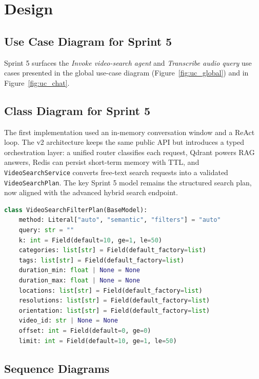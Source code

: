 \section{Design}

\subsection{Use Case Diagram for Sprint 5}

Sprint 5 surfaces the \emph{Invoke video-search agent} and \emph{Transcribe audio query} use cases
presented in the global use-case diagram (Figure~\ref{fig:uc_global}) and in
Figure~\ref{fig:uc_chat}.

\subsection{Class Diagram for Sprint 5}

The first implementation used an in-memory conversation window and a ReAct loop. The
v2 architecture keeps the same public API but introduces a typed orchestration layer: a unified
router classifies each request, Qdrant powers RAG answers, Redis can persist short-term memory
with TTL, and \texttt{VideoSearchService} converts free-text search requests into a validated
\texttt{VideoSearchPlan}. The key Sprint 5 model remains the structured search plan, now aligned
with the advanced hybrid search endpoint.

\begin{lstlisting}[language=python, caption={VideoSearchFilterPlan Pydantic model}]
class VideoSearchFilterPlan(BaseModel):
    method: Literal["auto", "semantic", "filters"] = "auto"
    query: str = ""
    k: int = Field(default=10, ge=1, le=50)
    categories: list[str] = Field(default_factory=list)
    tags: list[str] = Field(default_factory=list)
    duration_min: float | None = None
    duration_max: float | None = None
    locations: list[str] = Field(default_factory=list)
    resolutions: list[str] = Field(default_factory=list)
    orientation: list[str] = Field(default_factory=list)
    video_id: str | None = None
    offset: int = Field(default=0, ge=0)
    limit: int = Field(default=10, ge=1, le=50)
\end{lstlisting}

\subsection{Sequence Diagrams}

